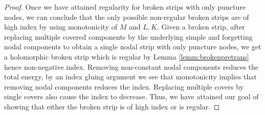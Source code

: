 \begin{proof}
Once we have attained regularity for broken strips with only puncture nodes, we can conclude that the only possible non-regular broken strips are of high index by using monotonicity of $M$ and $L,K$. Given a broken strip, after replacing multiple covered components by the underlying simple and forgetting nodal components to obtain a single nodal strip with only puncture nodes, we get a holomorphic broken strip which is regular by Lemma \ref{lemm:brokenpretrans} hence non-negative index. Removing non-constant nodal components reduces the total energy, by an index gluing argument we see that monotonicity implies that removing nodal components reduces the index. Replacing multiple covers by single covers also cause the index to decrease. Thus, we have attained our goal of showing that either the broken strip is of high index or is regular.
\end{proof}
